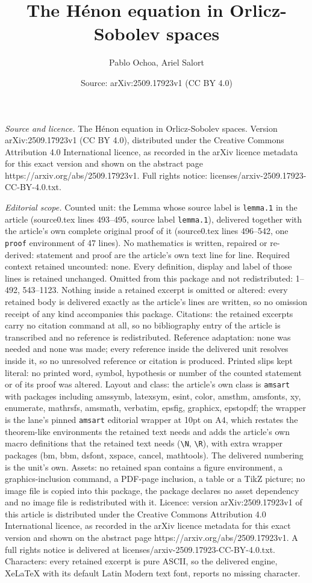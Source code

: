 \documentclass[10pt,a4paper]{amsart}
\title[The H\'enon equation in Orlicz-Sobolev spaces]{The H\'enon equation in Orlicz-Sobolev spaces}
\author{Pablo Ochoa, Ariel Salort}
\date{Source: arXiv:2509.17923v1 (CC BY 4.0)}
\begin{document}
\maketitle

\noindent\emph{Source and licence.} The H\'enon equation in Orlicz-Sobolev spaces. Version arXiv:2509.17923v1 (CC BY 4.0), distributed under the Creative Commons Attribution 4.0 International licence, as recorded in the arXiv licence metadata for this exact version and shown on the abstract page https://arxiv.org/abs/2509.17923v1. Full rights notice: licenses/arxiv-2509.17923-CC-BY-4.0.txt.\par\smallskip

\noindent\textit{Editorial scope.} Counted unit: the Lemma whose source label is \texttt{lemma.1} in the article (source0.tex lines 493--495, source label \texttt{lemma.1}), delivered together with the article's own complete original proof of it (source0.tex lines 496--542, one \texttt{proof} environment of 47 lines). No mathematics is written, repaired or re-derived: statement and proof are the article's own text line for line. Required context retained uncounted: none. Every definition, display and label of those lines is retained unchanged. Omitted from this package and not redistributed: 1--492, 543--1123. Nothing inside a retained excerpt is omitted or altered: every retained body is delivered exactly as the article's lines are written, so no omission receipt of any kind accompanies this package. Citations: the retained excerpts carry no citation command at all, so no bibliography entry of the article is transcribed and no reference is redistributed. Reference adaptation: none was needed and none was made; every reference inside the delivered unit resolves inside it, so no unresolved reference or citation is produced. Printed slips kept literal: no printed word, symbol, hypothesis or number of the counted statement or of its proof was altered. Layout and class: the article's own class is \texttt{amsart} with packages including amssymb, latexsym, esint, color, amsthm, amsfonts, xy, enumerate, mathrsfs, amsmath, verbatim, epsfig, graphicx, epstopdf; the wrapper is the lane's pinned \texttt{amsart} editorial wrapper at 10pt on A4, which restates the theorem-like environments the retained text needs and adds the article's own macro definitions that the retained text needs (\texttt{\textbackslash N}, \texttt{\textbackslash R}), with extra wrapper packages (bm, bbm, dsfont, xspace, cancel, mathtools). The delivered numbering is the unit's own. Assets: no retained span contains a figure environment, a graphics-inclusion command, a PDF-page inclusion, a table or a TikZ picture; no image file is copied into this package, the package declares no asset dependency and no image file is redistributed with it. Licence: version arXiv:2509.17923v1 of this article is distributed under the Creative Commons Attribution 4.0 International licence, as recorded in the arXiv licence metadata for this exact version and shown on the abstract page https://arxiv.org/abs/2509.17923v1. A full rights notice is delivered at licenses/arxiv-2509.17923-CC-BY-4.0.txt. Characters: every retained excerpt is pure ASCII, so the delivered engine, XeLaTeX with its default Latin Modern text font, reports no missing character.
\end{document}
